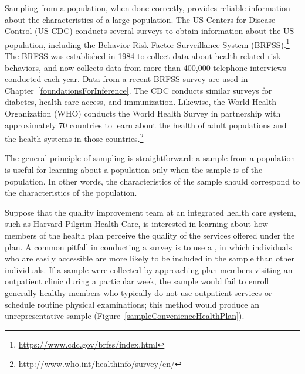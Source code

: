 Sampling from a population, when done correctly, provides reliable information about the characteristics of a large population. The US Centers for Disease Control (US CDC) conducts several surveys to obtain information about the US population, including the Behavior Risk Factor Surveillance System (BRFSS).\footnote{\url{https://www.cdc.gov/brfss/index.html}} The BRFSS was established in 1984 to collect data about health-related risk behaviors, and now collects data from more than 400,000 telephone interviews conducted each year. Data from a recent BRFSS survey are used in Chapter~\ref{foundationsForInference}. The CDC conducts similar surveys for diabetes, health care access, and immunization. Likewise, the World Health Organization (WHO) conducts the World Health Survey in partnership  with approximately 70 countries to learn about the health of adult populations and the health systems in those countries.\footnote{\url{http://www.who.int/healthinfo/survey/en/}}  

The general principle of sampling is straightforward: a sample from a population is useful for learning about a population only when the sample is  of the population. In other words, the characteristics of the sample should correspond to the characteristics of the population. 

Suppose that the quality improvement team at an integrated health care system, such as Harvard Pilgrim Health Care, is interested in learning about how members of the health plan perceive the quality of the services offered under the plan. A common pitfall in conducting a survey is to use a , in which individuals who are easily accessible are more likely to be included in the sample than other individuals. If a sample were collected by approaching plan members visiting an outpatient clinic during a particular week, the sample would fail to enroll generally healthy members who typically do not use outpatient services or schedule routine physical examinations; this method would produce an unrepresentative sample (Figure~\ref{sampleConvenienceHealthPlan}). 


